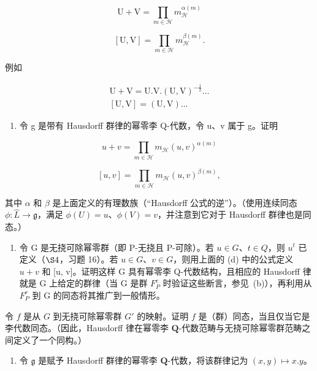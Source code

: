 \[
\mathrm{U} + \mathrm{V} = \prod_ {m \in \mathcal {H}} m _ {\mathcal {H}} ^ {\alpha (m)}
\]

\[
[ \mathrm{U}, \mathrm{V} ] = \prod_ {m \in \mathcal {H}} m _ {\mathcal {H}} ^ {\beta (m)}.
\]

例如

\[
\begin{array}{c} \mathrm{U} + \mathrm{V} = \mathrm{U}. \mathrm{V}. (\mathrm{U}, \mathrm{V}) ^ {- \frac {1}{2}} \dots \\ {} [ \mathrm{U}, \mathrm{V} ] = (\mathrm{U}, \mathrm{V}) \dots \end{array}
\]

\begin{enumerate}
\def\labelenumi{(\alph{enumi})}
\setcounter{enumi}{3}
\tightlist
\item
  令 g 是带有 Hausdorff 群律的幂零李 Q-代数，令 u、v 属于 g。证明
\end{enumerate}

\[
u + v = \prod_ {m \in \mathcal {H}} m _ {\mathcal {H}} (u, v) ^ {\alpha (m)}
\]

\[
[ u, v ] = \prod_ {m \in \mathcal {H}} m _ {\mathcal {H}} (u, v) ^ {\beta (m)},
\]

其中 \(\alpha\) 和 \(\beta\) 是上面定义的有理数族（“Hausdorff 公式的逆”）。（使用连续同态 \(\phi\colon\hat{L}\to\mathfrak{g}\)，满足 \(\phi(U)=u\)、\(\phi(V)=v\)，并注意到它对于 Hausdorff 群律也是同态。）

\begin{enumerate}
\def\labelenumi{(\alph{enumi})}
\setcounter{enumi}{4}
\tightlist
\item
  令 G 是无挠可除幂零群（即 P-无挠且 P-可除）。若 \(u \in G\)、\(t \in Q\)，则 \(u^{t}\) 已定义（\(\S 4\)，习题 16）。若 \(u \in G\)、\(v \in G\)，则用上面的 (d) 中的公式定义 \(u + v\) 和 {[}u, v{]}。证明这样 G 具有幂零李 Q-代数结构，且相应的 Hausdorff 律就是 G 上给定的群律（当 G 是群 \(F_{P}^{c}\) 时验证这些断言，参见~(b)），再利用从 \(F_{P}^{r}\) 到 G 的同态将其推广到一般情形。
\end{enumerate}

令 \(f\) 是从 \(G\) 到无挠可除幂零群 \(G'\) 的映射。证明 \(f\) 是（群）同态，当且仅当它是李代数同态。（因此，Hausdorff 律在幂零李 \(\mathbf{Q}\)-代数范畴与无挠可除幂零群范畴之间定义了一个同构。）

\begin{enumerate}
\def\labelenumi{\arabic{enumi}.}
\setcounter{enumi}{4}
\tightlist
\item
  令 \(\mathfrak{g}\) 是赋予 Hausdorff 群律的幂零李 \(\mathbf{Q}\)-代数，将该群律记为 \((x,y)\mapsto x.y\)。
\end{enumerate}

